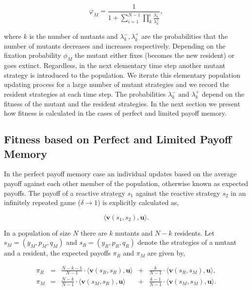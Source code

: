\documentclass[11pt]{article}
\theoremstyle{plainCl1}
\theoremstyle{plainCl2}
\begin{document}
\begin{equation}\label{eq:appendix_fixation_probability}
    \varphi_{M} = \frac{1}{1+\sum\limits_{i=1}^{N-1}\prod\limits_k^i \frac{\lambda^-_k}{\lambda^+_k}},
\end{equation}

where \(k\) is the number of
mutants and \(\lambda^-_k, \lambda^+_k\) are the probabilities that the number of
mutants decreases and increases respectively.
Depending on the fixation probability \(\phi_{M}\) the mutant either
fixes (becomes the new resident) or goes extinct. Regardless, in the next elementary
time step another mutant strategy is introduced to the population. We iterate
this elementary population updating process for a large number of mutant
strategies and we record the resident strategies at each time step. The
probabilities \(\lambda^-_k \text{ and } \lambda^+_k\) depend on the fitness
of the mutant and the resident strategies. In the next section we
present how fitness is calculated in the cases of perfect and limited payoff memory.

\subsection{Fitness based on Perfect and Limited Payoff Memory}

In the perfect payoff memory case an individual updates based on the average payoff
against each other member of the population, otherwise known as expected payoffs. 
The payoff of a reactive strategy \(s_1\) against the reactive strategy \(s_2\)
in an infinitely repeated game ($\delta \rightarrow 1$) is explicitly
calculated as,

\[\langle\mathbf{v}(s_1,s_2),\mathbf{u}\rangle.\]

In a population of size \(N\) there are \(k\) mutants and \(N - k\) residents.
Let \(s_M =(y_M, p_M, q_M)\) and \(s_R = (y_R, p_R, q_R)\) denote the
strategies of a mutant and a resident, the expected payoffs \(\pi_R\) and
\(\pi_M\) are given by,

\begin{equation} \label{Eq:ExpPay}
  \begin{array}{lcrcr}
  \displaystyle \pi_R & = &\displaystyle \frac{N\!-\!k\!-\!1}{N-1}\cdot \langle\mathbf{v}(s_R,s_R),\mathbf{u}\rangle	&+	&\displaystyle\frac{k}{N-1}\cdot \langle\mathbf{v}(s_R,s_M),\mathbf{u}\rangle,\\[0.5cm]
  \displaystyle \pi_M & = &\displaystyle\frac{N-k}{N-1}\cdot \langle\mathbf{v}(s_M,s_R),\mathbf{u}\rangle&+	&\displaystyle\frac{k-1}{N-1}\cdot \langle\mathbf{v}(s_M,s_M),\mathbf{u}\rangle.\\
  \end{array}
\end{equation}
\end{document}
